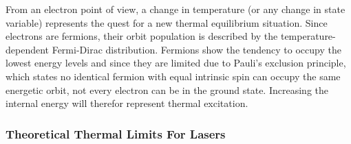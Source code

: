 From an electron point of view, a change in temperature (or any change in state variable) represents the quest for a new thermal equilibrium situation. Since electrons are fermions, their orbit population is described by the temperature-dependent Fermi-Dirac distribution. Fermions show the tendency to occupy the lowest energy levels and since they are limited due to Pauli's exclusion principle, which states no identical fermion with equal intrinsic spin can occupy the same energetic orbit, not every electron can be in the ground state. Increasing the internal energy will therefor represent thermal excitation.  

\subsubsection{Theoretical Thermal Limits For Lasers}
	
